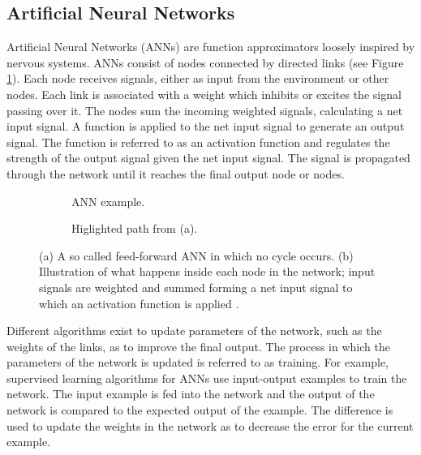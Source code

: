 \newpage
\subsection{Artificial Neural Networks}
\newline
{}
\newline
Artificial Neural Networks (ANNs) are function approximators loosely inspired by nervous systems.
ANNs consist of nodes connected by directed links (see Figure \ref{feedforward}). Each node receives signals, either as input from
the environment or other nodes. Each link is associated with a weight which inhibits or excites the signal passing
over it. The nodes sum the incoming weighted signals, calculating a net input signal. A function
is applied to the net input signal to generate an output signal. The function is referred to as an activation function
and regulates the strength of the output signal given the net input signal. The signal is propagated through the network
until it reaches the final output node or nodes.


\begin{figure}[htb]
    \begin{mdframed}
        \begin{subfigure}[b]{0.5\textwidth}
            \centering
            \resizebox{0.7\textwidth}{!}{}
            \caption{ANN example.}
            \label{feedforward}
        \end{subfigure}
        \begin{subfigure}[b]{0.5\textwidth}
            \centering
            \resizebox{0.9\textwidth}{!}{}
            \caption{Higlighted path from (a).}
            \label{neuron}
        \end{subfigure}
    \end{mdframed}
    \caption{(a) A so called feed-forward ANN in which no cycle occurs. (b) Illustration of what happens inside each node in the network; input
                 signals are weighted and summed forming a net input signal to which an activation function is applied .}
\end{figure}


\newline
Different algorithms exist to update parameters of the network, such as the weights of the
links, as to improve the final output. The process in which the parameters of the network is updated
is referred to as training. For example, supervised learning algorithms for ANNs use input-output examples
to train the network. The input example is fed into the network and the output of the network is compared to
the expected output of the example. The difference is used to update the weights in the network as to decrease
the error for the current example.


